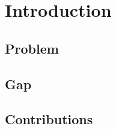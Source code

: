 \section{Introduction}
\label{sec:introduction}

\subsection{Problem}

\subsection{Gap}

\subsection{Contributions}
\label{sec:contributions}
